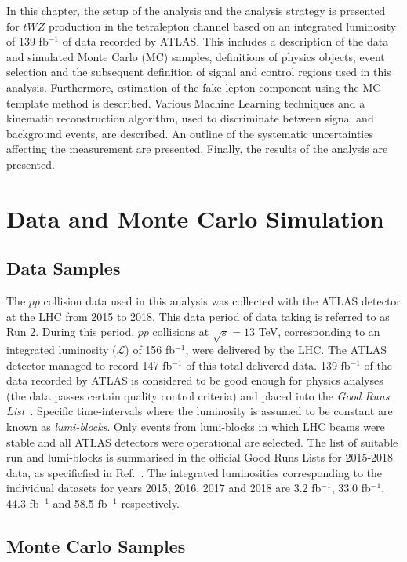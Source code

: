 

In this chapter, the setup of the analysis and the analysis strategy is presented for $tWZ$ production in the tetralepton channel based on an integrated luminosity of 139 fb$^{-1}$ of data recorded by ATLAS. This includes a description of the data and simulated Monte Carlo (MC) samples, definitions of physics objects, event selection and the subsequent definition of signal and control regions used in this analysis. Furthermore, estimation of the fake lepton component using the MC template method is described. Various Machine Learning techniques and a kinematic reconstruction algorithm, used to discriminate between signal and background events, are described. An outline of the systematic uncertainties affecting the measurement are presented. Finally, the results of the analysis are presented.


\section{Data and Monte Carlo Simulation}
\subsection{Data Samples}
The $pp$ collision data used in this analysis was collected with the ATLAS detector at the LHC from 2015 to 2018. This data period of data taking is referred to as Run 2. During this period, $pp$ collisions at $\sqrt{s}=13$ TeV, corresponding to an integrated luminosity ($\mathcal{L}$) of 156 fb$^{-1}$, were delivered by the LHC. The ATLAS detector managed to record 147 fb$^{-1}$ of this total delivered data. 139 fb$^{-1}$ of the data recorded by ATLAS is considered to be good enough for physics analyses (the data passes certain quality control criteria) and placed into the \textit{Good Runs List}~\cite{GoodRunLists}. Specific time-intervals where the luminosity is assumed to be constant are known as \textit{lumi-blocks}. Only events from lumi-blocks in which LHC beams were stable and all ATLAS detectors were operational are selected. The list of suitable run and lumi-blocks is summarised in the official Good Runs Lists for 2015-2018 data, as specificfied in Ref.~\cite{goodrunslist}. The integrated luminosities corresponding to the individual datasets for years 2015, 2016, 2017 and 2018 are 3.2 fb$^{-1}$, 33.0 fb$^{-1}$, 44.3 fb$^{-1}$ and 58.5 fb$^{-1}$ respectively.


\subsection{Monte Carlo Samples}
\label{sec:mcsamples}

